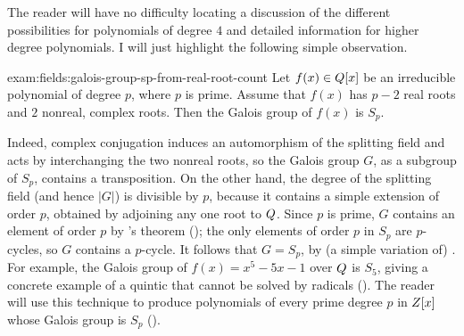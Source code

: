 The reader will have no difficulty locating a discussion of the
different possibilities for polynomials of degree $4$ and detailed
information for higher degree polynomials. I will just highlight the
following simple observation.
\begin{exam}{}{exam:fields:galois-group-sp-from-real-root-count}
  Let $f(x) \in Q[x]$ be an irreducible polynomial of degree $p$,
  where $p$ is prime. Assume that $f(x)$ has $p - 2$ real roots and
  $2$ nonreal, complex roots. Then the Galois group of $f(x)$ is
  $S_p$.

  Indeed, complex conjugation induces an automorphism of the splitting
  field and acts by interchanging the two nonreal roots, so the Galois
  group $G$, as a subgroup of $S_p$, contains a transposition. On the
  other hand, the degree of the splitting field (and hence $|G|$) is
  divisible by $p$, because it contains a simple extension of order
  $p$, obtained by adjoining any one root to $Q$. Since $p$ is prime,
  $G$ contains an element of order $p$ by 's theorem
  (); the only elements of order $p$ in $S_p$
  are $p$-cycles, so $G$ contains a $p$-cycle. It follows that
  $G = S_p$, by (a simple variation of)
  . For example,
  the Galois group of $f(x) = x^5 - 5x - 1$ over $Q$ is $S_5$, giving
  a concrete example of a quintic that cannot be solved by radicals
  (). The
  reader will use this technique to produce polynomials of every prime
  degree $p$ in $Z[x]$ whose Galois group is $S_p$
  ().
\end{exam}

